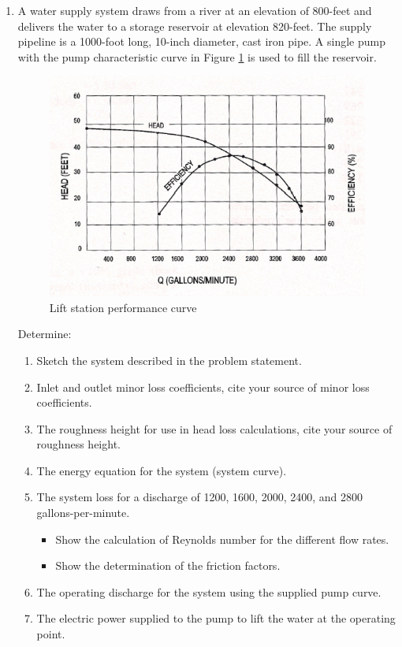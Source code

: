 \documentclass[12pt]{article}
\begin{document}
\begin{enumerate}

\item A water supply system draws from a river at an elevation of 800-feet and delivers the
water to a storage reservoir at elevation 820-feet. The supply pipeline is a 1000-foot
long, 10-inch diameter, cast iron pipe. A single pump with the pump characteristic
curve in Figure \ref{fig:PumpCurve} is used to fill the reservoir.

\begin{figure}[h!] %
\centering
   \includegraphics[width=6in]{PumpCurve.png}
   \caption{Lift station performance curve}
   \label{fig:PumpCurve} 
\end{figure}
\clearpage

Determine:
\begin{enumerate}
\item Sketch the system described in the problem statement.
\item Inlet and outlet minor loss coefficients, cite your source of minor loss coefficients.
\item The roughness height for use in head loss calculations, cite your source of roughness height.
\item The energy equation for the system (system curve).
\item The system loss for a discharge of 1200, 1600, 2000, 2400, and 2800 gallons-per-minute. 
    \begin{itemize}
    \item Show the calculation of Reynolds number for the different flow rates. 
    \item Show the determination of the friction factors.
    \end{itemize}
\item The operating discharge for the system using the supplied pump curve.
\item The electric power supplied to the pump to lift the water at the operating point.
\end{enumerate}
\clearpage


\end{enumerate}
\end{document}
